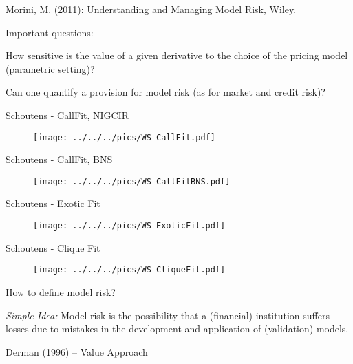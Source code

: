 	Morini, M. (2011): Understanding and Managing Model Risk, Wiley.






	Important questions:






	How sensitive is the value of a given derivative to the choice of the pricing model (parametric setting)?


	Can one quantify a provision for model risk (as for market and credit risk)?










{Schoutens - CallFit, NIGCIR}
\begin{figure}[htp]
\centering
\texttt{[image: ../../../pics/WS-CallFit.pdf]}
\end{figure}

{Schoutens - CallFit, BNS}
\begin{figure}[htp]
\centering
\texttt{[image: ../../../pics/WS-CallFitBNS.pdf]}
\end{figure}

{Schoutens - Exotic Fit}
\begin{figure}[htp]
\centering
\texttt{[image: ../../../pics/WS-ExoticFit.pdf]}
\end{figure}

{Schoutens - Clique Fit}
\begin{figure}[htp]
\centering
\texttt{[image: ../../../pics/WS-CliqueFit.pdf]}
\end{figure}

{How to define model risk?}






	{\it Simple Idea:} Model risk is the possibility that a (financial) institution suffers losses due to mistakes in the development and application of (validation) models.





{Derman (1996) -- Value Approach}






